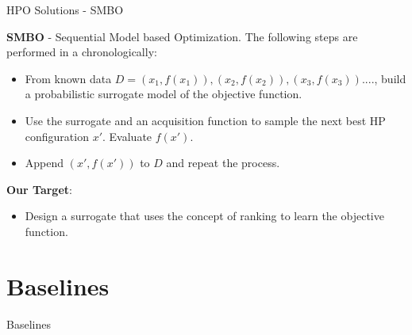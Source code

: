\documentclass{beamer}
\begin{document}
\begin{frame}[t]{HPO Solutions - SMBO}

\textbf{SMBO} - Sequential Model based Optimization. The following steps are performed in a chronologically:

\begin{itemize}
\item From known data $D = {(x_1, f(x_1)), (x_2, f(x_2)), (x_3, f(x_3)) .... }$, build a probabilistic surrogate model of the objective function.
\item Use the surrogate and an acquisition function to sample the next best HP configuration $x'$. Evaluate $f(x')$.
\item Append $(x', f(x'))$ to $D$ and repeat the process.
\end{itemize}

\textbf{Our Target}:

\begin{itemize}
\item Design a surrogate that uses the concept of ranking to learn the objective function.
\end{itemize}
\end{frame}


\section{Baselines}
\begin{frame}

\centering
\LARGE{Baselines}

\end{frame}
\end{document}
